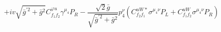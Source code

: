 %
\begin{dmath*}
%
  +  i v \sqrt{{\bar g}^{\prime 2} + {\bar g}{}^2} C^{ \varphi  u}_{f_1 f_2} \gamma^{\mu_4} P_R  -  \frac{\sqrt{2} {\bar g}{}}{\sqrt{{\bar g}^{\prime 2} + {\bar g}{}^2}} p_4^{\nu} \left(C^{uW*}_{f_2 f_1} \sigma^{\mu_4 \nu } P_L  + C^{uW}_{f_1 f_2} \sigma^{\mu_4 \nu } P_R \right)
%
\end{dmath*}
%
